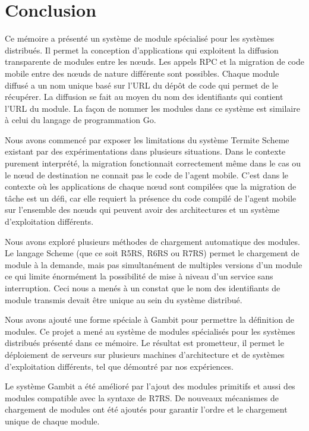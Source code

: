 
\chapter{Conclusion}

Ce mémoire a présenté un système de module spécialisé pour les systèmes
distribués. Il permet la conception d'applications qui exploitent la diffusion
transparente de
modules entre les nœuds. Les appels RPC et la migration de code mobile entre
des nœuds de nature différente sont possibles. Chaque module diffusé a un nom
unique basé sur l'URL du dépôt de code qui permet de le récupérer. La diffusion
se fait au moyen du nom des identifiants qui contient l'URL du module. La façon de nommer les
modules dans ce système est similaire à celui du langage de programmation Go.

Nous avons commencé par exposer les limitations du système Termite Scheme
existant par des expérimentations dans plusieurs situations. Dans le contexte
purement interprété, la migration fonctionnait correctement même dans le cas ou
le nœud de destination ne connait pas le code de l'agent mobile.  C'est dans le
contexte où les applications de chaque nœud sont compilées que la migration de
tâche est un défi, car elle requiert la présence du code compilé de l'agent
mobile sur l'ensemble des nœuds qui peuvent avoir des architectures et un
système d'exploitation différents.

Nous avons exploré plusieurs méthodes de chargement automatique des modules.
Le langage Scheme (que ce soit R5RS, R6RS ou R7RS) permet le chargement de
module à la demande, mais pas simultanément de multiples versions d'un module ce
qui limite énormément la possibilité de mise à niveau d'un service sans
interruption.  Ceci nous a menés à un constat que le nom des identifiants de
module transmis devait être unique au sein du système distribué.

Nous avons ajouté une forme spéciale à Gambit pour permettre la définition de
modules. Ce projet a mené au système de modules spécialisés pour les systèmes
distribués présenté dans ce mémoire. Le résultat est prometteur, il permet le
déploiement de serveurs sur plusieurs machines d'architecture et de systèmes
d'exploitation différents, tel que démontré par nos expériences.

Le système Gambit a été amélioré par l'ajout des modules primitifs et aussi des
modules compatible avec la syntaxe de R7RS. De nouveaux mécanismes de
chargement de modules ont été ajoutés pour garantir l'ordre et le chargement
unique de chaque module.

